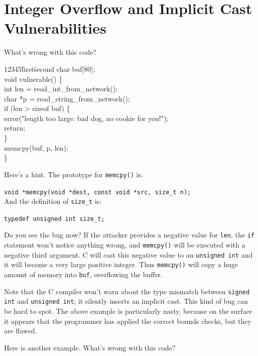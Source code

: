 \documentclass[11pt]{article}
\begin{document}
\section{Integer Overflow and Implicit Cast Vulnerabilities}

What's wrong with this code?

\begin{ttfamily}
\begin{tabbing}
12345\=first\=second \kill
char buf[80]; \\
void vulnerable() \{ \\
\>int len = read\_int\_from\_network(); \\
\>char *p = read\_string\_from\_network(); \\
\>if (len > sizeof buf) \{ \\
\>\>error("length too large: bad dog, no cookie for you!"); \\
\>\>return; \\
\>\} \\
\>memcpy(buf, p, len);\\
\}\\
\end{tabbing}
\end{ttfamily}

Here's a hint.  The prototype for \texttt{memcpy()} is:

\noindent \texttt{void *memcpy(void *dest, const void *src, size\_t n);}\\

And the definition of \texttt{size\_t} is:

\texttt{typedef unsigned int size\_t;}

Do you see the bug now? If the attacker provides a negative value for
\texttt{len}, the \texttt{if} statement won't notice anything wrong, and 
\texttt{memcpy()} will be executed with a negative third argument.  
C will cast this negative value to an \texttt{unsigned int} and
it will become a very large positive integer.  Thus \texttt{memcpy()} will copy a huge
amount of memory into \texttt{buf}, overflowing the buffer.

Note that the C compiler won't warn about the type mismatch between
\texttt{signed int} and \texttt{unsigned int}; it silently inserts an implicit
cast. This kind of bug can be hard to spot. The above example is
particularly nasty, because on the surface it appears that the
programmer has applied the correct bounds checks, but they are flawed.

Here is another example. What's wrong with this code?
\end{document}
